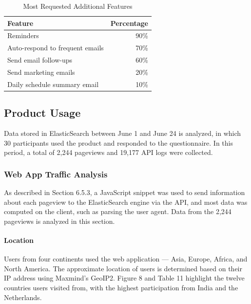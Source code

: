 \documentclass{article}
\begin{document}
\begin{table}[!htb]
	\begin{minipage}{1\linewidth}
		\caption{Most Requested Additional Features}
		\centering
		\begin{tabular}{lr}
			\hline
			\textbf{Feature}                & \textbf{Percentage} \\
			\hline
			Reminders                       & 90\%                \\
			Auto-respond to frequent emails & 70\%                \\
			Send email follow-ups           & 60\%                \\
			Send marketing emails           & 20\%                \\
			Daily schedule summary email    & 10\%                \\
			\hline
		\end{tabular}
	\end{minipage}%
\end{table}

\subsection{Product Usage}

Data stored in ElasticSearch between June 1 and June 24 is analyzed, in which 30 participants used the product and responded to the questionnaire. In this period, a total of 2,244 pageviews and 19,177 API logs were collected.

\subsubsection{Web App Traffic Analysis}

As described in Section 6.5.3, a JavaScript snippet was used to send information about each pageview to the ElasticSearch engine via the API, and most data was computed on the client, such as parsing the user agent. Data from the 2,244 pageviews is analyzed in this section.

\paragraph{Location}

Users from four continents used the web application --- Asia, Europe, Africa, and North America. The approximate location of users is determined based on their IP address using Maxmind's GeoIP2. Figure 8 and Table 11 highlight the twelve countries users visited from, with the highest participation from India and the Netherlands.
\end{document}
